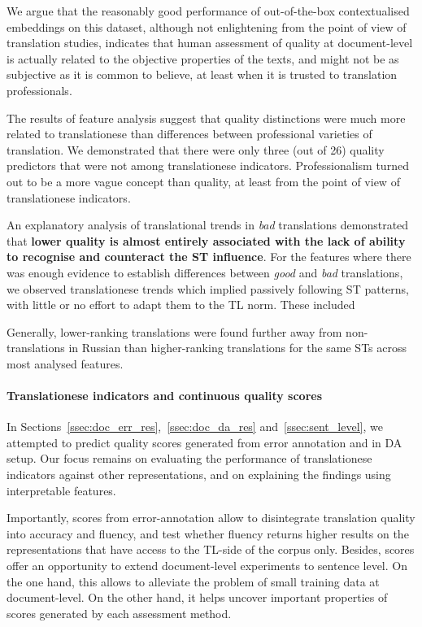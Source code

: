 We argue that the reasonably good performance of out-of-the-box contextualised embeddings on this dataset, although not enlightening from the point of view of translation studies, indicates that human assessment of quality at document-level is actually related to the objective properties of the texts, and might not be as subjective as it is common to believe, at least when it is trusted to translation professionals. 

The results of feature analysis suggest that quality distinctions were much more related to translationese than differences between professional varieties of translation. 
We demonstrated that there were only three (out of 26) quality predictors that were not among translationese indicators. Professionalism turned out to be a more vague concept than quality, at least from the point of view of translationese indicators.

An explanatory analysis of translational trends in \textit{bad} translations demonstrated that \textbf{lower quality is almost entirely associated with the lack of ability to recognise and counteract the ST influence}. For the features where there was enough evidence to establish differences between \textit{good} and \textit{bad} translations, we observed translationese trends which implied passively following ST patterns, with little or no effort to adapt them to the TL norm. These included 
 
Generally, lower-ranking translations were found further away from non-translations in Russian than higher-ranking translations for the same STs across most analysed features.  
\paragraph{Translationese indicators and continuous quality scores}
In Sections~\ref{ssec:doc_err_res},~\ref{ssec:doc_da_res} and~\ref{ssec:sent_level}, we attempted to predict quality scores generated from error annotation and in DA setup. Our focus remains on evaluating the performance of translationese indicators against other representations, and on explaining the findings using interpretable features.

Importantly, scores from error-annotation allow to disintegrate translation quality into accuracy and fluency, and test whether fluency returns higher results on the representations that have access to the TL-side of the corpus only. 
Besides, scores offer an opportunity to extend document-level experiments to sentence level. On the one hand, this allows to alleviate the problem of small training data at document-level. On the other hand, it helps uncover important properties of scores generated by each assessment method.

